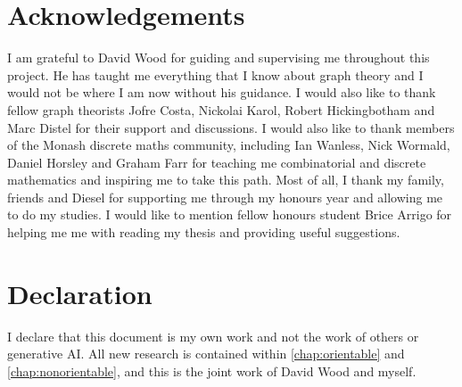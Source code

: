 \section*{Acknowledgements}
I am grateful to David Wood for guiding and supervising me throughout this project. He has taught me everything that I know about graph theory and I would not be where I am now without his guidance. I would also like to thank fellow graph theorists Jofre Costa, Nickolai Karol, Robert Hickingbotham and Marc Distel for their support and discussions. I would also like to thank members of the Monash discrete maths community, including Ian Wanless, Nick Wormald, Daniel Horsley and Graham Farr for teaching me combinatorial and discrete mathematics and inspiring me to take this path. Most of all, I thank my family, friends and Diesel for supporting me through my honours year and allowing me to do my studies. I would like to mention fellow honours student Brice Arrigo for helping me me with reading my thesis and providing useful suggestions.

\section*{Declaration}

I declare that this document is my own work and not the work of others or generative AI. All new research is contained within \cref{chap:orientable} and \cref{chap:nonorientable}, and this is the joint work of David Wood and myself.